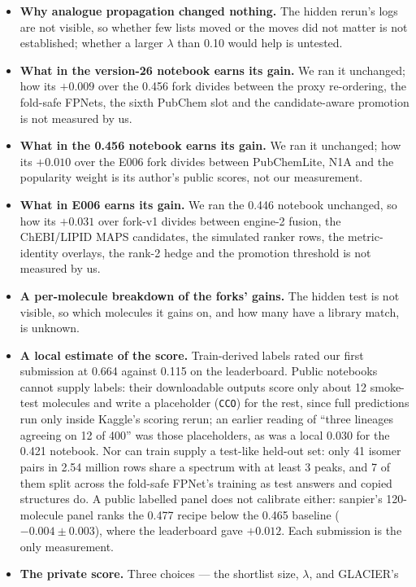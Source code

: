 \documentclass[11pt]{article}
\begin{document}
\begin{itemize}
    (each showed 0.472 upstream alone).
  \item \textbf{Why analogue propagation changed nothing.} The hidden rerun's logs are not visible, so whether
    few lists moved or the moves did not matter is not established; whether a larger $\lambda$ than 0.10
    would help is untested.
  \item \textbf{What in the version-26 notebook earns its gain.} We ran it unchanged; how its $+0.009$
    over the 0.456 fork divides between the proxy re-ordering, the fold-safe FPNets, the sixth PubChem
    slot and the candidate-aware promotion is not measured by us.
  \item \textbf{What in the 0.456 notebook earns its gain.} We ran it unchanged; how its $+0.010$ over
    the E006 fork divides between PubChemLite, N1A and the popularity weight is its author's public
    scores, not our measurement.
  \item \textbf{What in E006 earns its gain.} We ran the 0.446 notebook unchanged, so how its $+0.031$
    over fork-v1 divides between engine-2 fusion, the ChEBI/LIPID MAPS candidates, the simulated ranker
    rows, the metric-identity overlays, the rank-2 hedge and the promotion threshold is not measured by us.
  \item \textbf{A per-molecule breakdown of the forks' gains.} The hidden test is not visible, so which
    molecules it gains on, and how many have a library match, is unknown.
  \item \textbf{A local estimate of the score.} Train-derived labels rated our first submission at 0.664
    against 0.115 on the leaderboard. Public notebooks cannot supply labels: their downloadable outputs
    score only about 12 smoke-test molecules and write a placeholder (\texttt{CCO}) for the rest, since
    full predictions run only inside Kaggle's scoring rerun; an earlier reading of ``three lineages
    agreeing on 12 of 400'' was those placeholders, as was a local 0.030 for the 0.421 notebook. Nor can train supply a test-like held-out set: only 41 isomer pairs in
    2.54 million rows share a spectrum with at least 3 peaks, and 7 of them split across the
    fold-safe FPNet's training as test answers and copied structures do. A public labelled panel does not
    calibrate either: sanpier's 120-molecule panel ranks the 0.477 recipe below the 0.465 baseline
    ($-0.004 \pm 0.003$), where the leaderboard gave $+0.012$. Each submission is the only measurement.
  \item \textbf{The private score.} Three choices --- the shortlist size, $\lambda$, and GLACIER's

\end{itemize}
\end{document}
